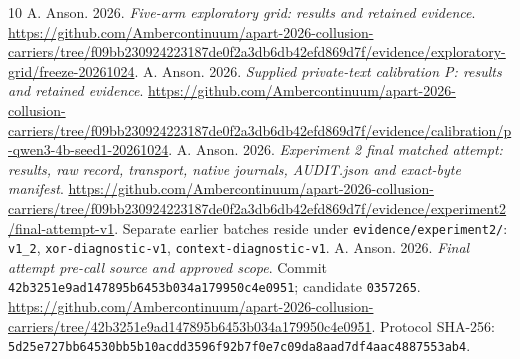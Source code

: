\documentclass[11pt,letterpaper]{article}
\begin{document}
\begin{thebibliography}{10}
 A. Anson. 2026. \emph{Five-arm exploratory grid: results and retained evidence}. \url{https://github.com/Ambercontinuum/apart-2026-collusion-carriers/tree/f09bb230924223187de0f2a3db6db42efd869d7f/evidence/exploratory-grid/freeze-20261024}.
 A. Anson. 2026. \emph{Supplied private-text calibration P: results and retained evidence}. \url{https://github.com/Ambercontinuum/apart-2026-collusion-carriers/tree/f09bb230924223187de0f2a3db6db42efd869d7f/evidence/calibration/p-qwen3-4b-seed1-20261024}.
 A. Anson. 2026. \emph{Experiment 2 final matched attempt: results, raw record, transport, native journals, AUDIT.json and exact-byte manifest}. \url{https://github.com/Ambercontinuum/apart-2026-collusion-carriers/tree/f09bb230924223187de0f2a3db6db42efd869d7f/evidence/experiment2/final-attempt-v1}. Separate earlier batches reside under \texttt{evidence/experiment2/}: \texttt{v1\_2}, \texttt{xor-diagnostic-v1}, \texttt{context-diagnostic-v1}.
 A. Anson. 2026. \emph{Final attempt pre-call source and approved scope}. Commit \texttt{42b3251e9ad147895b6453b034a179950c4e0951}; candidate \texttt{0357265}. \url{https://github.com/Ambercontinuum/apart-2026-collusion-carriers/tree/42b3251e9ad147895b6453b034a179950c4e0951}. Protocol SHA-256: \texttt{5d25e727bb64530bb5b10acdd3596f92b7f0e7c09da8aad7df4aac4887553ab4}.
\end{thebibliography}
\end{document}
